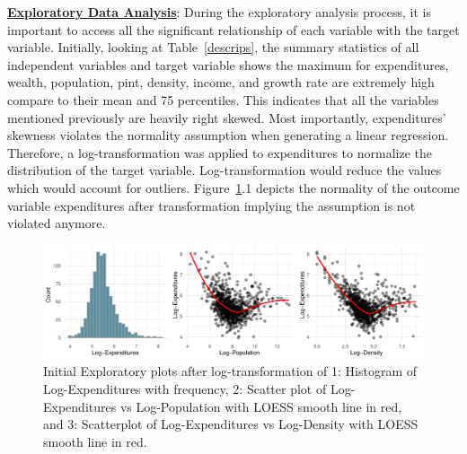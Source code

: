 \documentclass[11pt]{article}\usepackage[]{graphicx}\usepackage[]{color}
\makeatletter
\def\maxwidth{ %
  \ifdim\Gin@nat@width>\linewidth
    \linewidth
  \else
    \Gin@nat@width
  \fi
}
\makeatother
\begin{document}
\noindent\textbf{\underline{Exploratory Data Analysis}}: During the exploratory analysis process, it is important to access all the significant relationship of each variable with the target variable. Initially, looking at Table~\ref{descrips}, the summary statistics of all independent variables and target variable shows the maximum for expenditures, wealth, population, pint, density, income, and growth rate are extremely high compare to their mean and 75 percentiles. This indicates that all the variables mentioned previously are heavily right skewed. Most importantly, expenditures’ skewness violates the normality assumption when generating a linear regression. Therefore, a log-transformation was applied to expenditures to normalize the distribution of the target variable. Log-transformation would reduce the values which would account for outliers. Figure~\ref{inital-explore}.1 depicts the normality of the outcome variable expenditures after transformation implying the assumption is not violated anymore.

\begin{figure}[h!] 
\begin{center}

\includegraphics[width=\maxwidth]{figure/unnamed-chunk-1-1} 

\caption{Initial Exploratory plots after log-transformation of 1: Histogram of Log-Expenditures with frequency, 2: Scatter plot of Log-Expenditures vs Log-Population with LOESS smooth line in red, and 3: Scatterplot of Log-Expenditures vs Log-Density with LOESS smooth line in red.}
\label{inital-explore}
\end{center} 
\end{figure}
\end{document}
